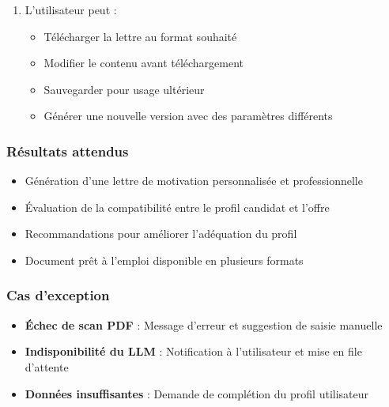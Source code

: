 \begin{enumerate}
    \item L'utilisateur peut :
    \begin{itemize}
        \item Télécharger la lettre au format souhaité
        \item Modifier le contenu avant téléchargement
        \item Sauvegarder pour usage ultérieur
        \item Générer une nouvelle version avec des paramètres différents
    \end{itemize}
\end{enumerate}

\subsubsection*{Résultats attendus}
\begin{itemize}
    \item Génération d'une lettre de motivation personnalisée et professionnelle
    \item Évaluation de la compatibilité entre le profil candidat et l'offre
    \item Recommandations pour améliorer l'adéquation du profil
    \item Document prêt à l'emploi disponible en plusieurs formats
\end{itemize}

\subsubsection*{Cas d'exception}
\begin{itemize}
    \item \textbf{Échec de scan PDF} : Message d'erreur et suggestion de saisie manuelle
    \item \textbf{Indisponibilité du LLM} : Notification à l'utilisateur et mise en file d'attente
    \item \textbf{Données insuffisantes} : Demande de complétion du profil utilisateur
\end{itemize}


